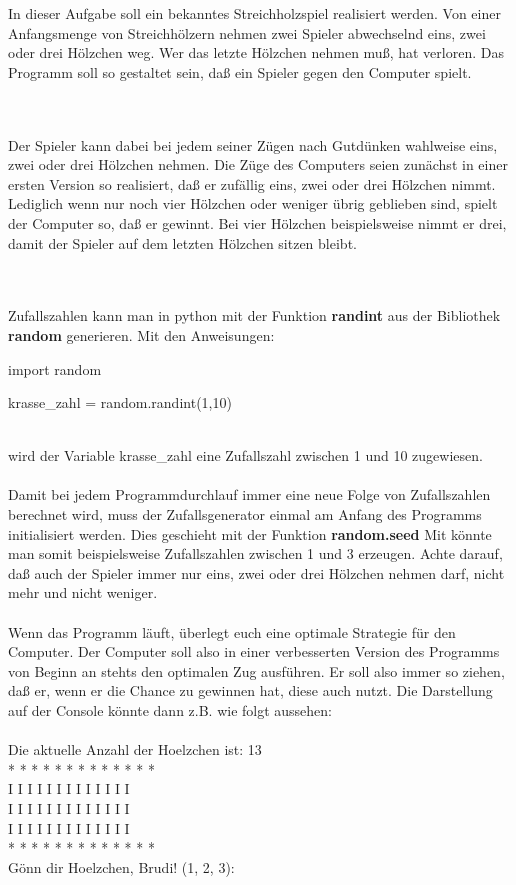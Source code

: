 In dieser Aufgabe soll ein bekanntes Streichholzspiel realisiert werden. Von einer Anfangsmenge von Streichhölzern nehmen zwei Spieler abwechselnd eins, zwei oder drei Hölzchen weg. Wer das
letzte Hölzchen nehmen muß, hat verloren. Das Programm soll so gestaltet sein, daß ein Spieler gegen den Computer spielt.

\ \\ \\Der Spieler kann dabei bei jedem seiner Zügen nach Gutdünken wahlweise eins, zwei oder drei Hölzchen nehmen. Die Züge des Computers seien zunächst in einer ersten Version so realisiert, daß er zufällig eins, zwei oder drei Hölzchen nimmt.
Lediglich wenn nur noch vier Hölzchen oder weniger übrig geblieben sind, spielt der Computer so, daß er gewinnt.
Bei vier Hölzchen beispielsweise nimmt er drei, damit der Spieler auf dem letzten Hölzchen sitzen bleibt. 

\ \\ \\Zufallszahlen kann man in python mit der Funktion \textbf{randint} aus der Bibliothek \textbf{random} generieren. Mit den Anweisungen:
\begin{python}
import random

krasse_zahl = random.randint(1,10)
\end{python}
\ \\wird der Variable krasse\_zahl eine Zufallszahl zwischen 1 und 10 zugewiesen. \ \\\\Damit bei jedem Programmdurchlauf immer eine neue Folge von Zufallszahlen berechnet wird, muss der Zufallsgenerator einmal am Anfang des Programms initialisiert werden. Dies geschieht mit der Funktion \textbf{random.seed} 
Mit könnte man somit beispielsweise Zufallszahlen zwischen 1 und 3 erzeugen. Achte darauf, daß
auch der Spieler immer nur eins, zwei oder drei Hölzchen nehmen darf, nicht mehr und nicht weniger. 
\ \\\\
Wenn das Programm läuft, überlegt euch eine optimale Strategie für den Computer. Der Computer soll also in einer verbesserten Version des Programms von
Beginn an stehts den optimalen Zug ausführen. Er soll also immer so ziehen, daß er, wenn er die
Chance zu gewinnen hat, diese auch nutzt.
Die Darstellung auf der Console könnte dann z.B. wie folgt aussehen:
\ \\\\
Die aktuelle Anzahl der Hoelzchen ist: 13
\ \\* * * * * * * * * * * * *
\ \\I I I I I I I I I I I I I
\ \\I I I I I I I I I I I I I
\ \\I I I I I I I I I I I I I
\ \\* * * * * * * * * * * * *
\ \\Gönn dir Hoelzchen, Brudi! (1, 2, 3):
